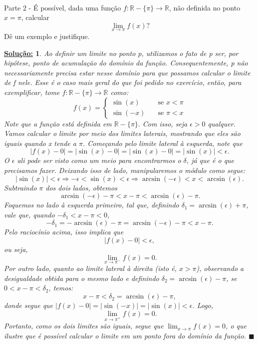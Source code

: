 \documentclass{article}
\newtheorem*{sol*}{\underline{Solu\c c\~ao:}}
\renewcommand\qedsymbol{$\blacksquare$}
\begin{document}
\paragraph{} Parte 2 - \'E poss\'ivel, dada uma fun\c c\~ao $f:\mathbb{R}-\{\pi\}\rightarrow \mathbb{R}$, n\~ao definida no ponto $x=\pi$, calcular 
$$
\lim_{x\to\pi}f(x)?
$$
D\^e um exemplo e justifique.
\begin{sol*}
Ao definir um limite no ponto p, utilizamos o fato de p ser, por hip\'otese, ponto de acumula\c c\~ao do dom\'inio da fun\c c\~ao. Consequentemente, p n\~ao necessariamente precisa estar nesse dom\'inio para que possamos calcular o limite de f nele. Esse \'e o caso mais geral do que foi pedido no exerc\'icio, ent\~ao, para exemplificar, tome $f:\mathbb{R}-\{\pi\}\rightarrow\mathbb{R}$ como:
$$
f(x) = \left\{\begin{array}{ll}
	\sin(x) & \quad \text{se } x < \pi \\
	\sin(-x) & \quad \text{se } \pi < x
\end{array}\right.
$$
Note que a fun\c c\~ao est\'a definida em $\mathbb{R}-\{\pi\}.$ Com isso, seja $\epsilon > 0$ qualquer. Vamos calcular o limite por meio dos limites laterais, mostrando que eles s\~ao iguais quando x tende a $\pi$. Come\c cando pelo limite lateral \`a esquerda, note que
$$
|f(x) - 0| = |\sin(x) - 0| = |\sin(x) - 0| = |\sin(x)|< \epsilon.
$$
O $\epsilon$ ali pode ser visto como um meio para encontrarmos o $\delta$, j\'a que \'e o que precisamos fazer. Deixando isso de lado, manipularemos o m\'odulo como segue:
$$
|\sin(x)| < \epsilon \Rightarrow -\epsilon < \sin(x) < \epsilon \Rightarrow \arcsin(-\epsilon) < x < \arcsin(\epsilon).
$$
Subtraindo $\pi$ dos dois lados, obtemos
$$
\arcsin(-\epsilon) - \pi < x - \pi < \arcsin(\epsilon) - \pi.
$$
Foquemos no lado \`a esquerda primeiro, tal que, definindo $\delta_1 = \arcsin(\epsilon) + \pi$, vale que, quando $-\delta_1 < x - \pi < 0$, 
$$
-\delta_1 = -\arcsin(\epsilon) - \pi = \arcsin(-\epsilon) - \pi < x - \pi.
$$
Pelo racioc\'inio acima, isso implica que 
$$
|f(x) - 0| < \epsilon,
$$
ou seja, 
$$
\lim_{x\to\pi^{-}}f(x) = 0.
$$
Por outro lado, quanto ao limite lateral \`a direita (isto \'e, $x > \pi$), observando a desigualdade obtida para o mesmo lado e definindo $\delta_2 = \arcsin(\epsilon) - \pi $, se $0 < x - \pi < \delta_2$, temos:
$$
x - \pi < \delta_2 = \arcsin(\epsilon) - \pi,
$$
donde segue que $|f(x) - 0| = |\sin(-x)| = |\sin(x)| < \epsilon$. Logo,
$$
\lim_{x\to\pi^{+}}f(x) = 0.
$$
Portanto, como os dois limites s\~ao iguais, segue que $\lim_{x\to\pi} f(x) = 0$, o que ilustre que \'e poss\'ivel calcular o limite em um ponto fora do dom\'inio da fun\c c\~ao.
\qedsymbol
\end{sol*}
\end{document}
